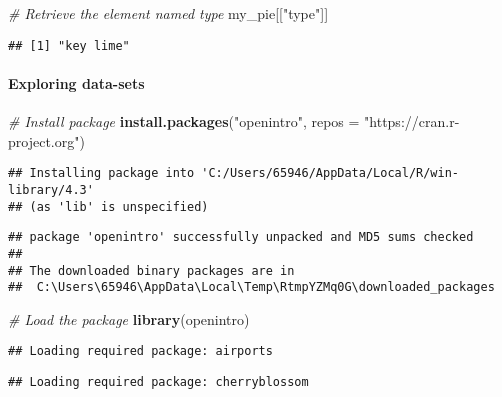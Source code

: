 \documentclass[
]{article}
\newenvironment{Shaded}{\begin{snugshade}}{\end{snugshade}}
\newcommand{\AttributeTok}[1]{\textcolor[rgb]{0.13,0.29,0.53}{#1}}
\newcommand{\CommentTok}[1]{\textcolor[rgb]{0.56,0.35,0.01}{\textit{#1}}}
\newcommand{\FunctionTok}[1]{\textcolor[rgb]{0.13,0.29,0.53}{\textbf{#1}}}
\newcommand{\NormalTok}[1]{#1}
\newcommand{\StringTok}[1]{\textcolor[rgb]{0.31,0.60,0.02}{#1}}
\begin{document}
\begin{Shaded}
\begin{Highlighting}[]
\CommentTok{\# Retrieve the element named type}
\NormalTok{my\_pie[[}\StringTok{"type"}\NormalTok{]]}
\end{Highlighting}
\end{Shaded}

\begin{verbatim}
## [1] "key lime"
\end{verbatim}

\hypertarget{exploring-data-sets}{%
\paragraph{Exploring data-sets}\label{exploring-data-sets}}

\begin{Shaded}
\begin{Highlighting}[]
\CommentTok{\# Install package}
\FunctionTok{install.packages}\NormalTok{(}\StringTok{"openintro"}\NormalTok{, }\AttributeTok{repos =} \StringTok{"https://cran.r{-}project.org"}\NormalTok{)}
\end{Highlighting}
\end{Shaded}

\begin{verbatim}
## Installing package into 'C:/Users/65946/AppData/Local/R/win-library/4.3'
## (as 'lib' is unspecified)
\end{verbatim}

\begin{verbatim}
## package 'openintro' successfully unpacked and MD5 sums checked
## 
## The downloaded binary packages are in
##  C:\Users\65946\AppData\Local\Temp\RtmpYZMq0G\downloaded_packages
\end{verbatim}

\begin{Shaded}
\begin{Highlighting}[]
\CommentTok{\# Load the package}
\FunctionTok{library}\NormalTok{(openintro)}
\end{Highlighting}
\end{Shaded}

\begin{verbatim}
## Loading required package: airports
\end{verbatim}

\begin{verbatim}
## Loading required package: cherryblossom
\end{verbatim}
\end{document}
